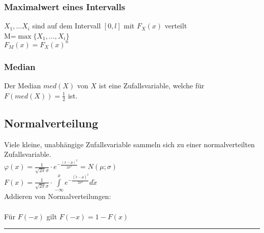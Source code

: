 \begin{multicols}{2}    
  \subsubsection{Maximalwert eines Intervalls}
    $X_1,\ldots X_i$ sind auf dem Intervall $[0,l]$ mit $F_X(x)$ verteilt\\
    M=$\max \{ X_1,\ldots,X_i\} $ \\
    $F_M(x)=F_X(x)^n$ \\
	\columnbreak
  \subsubsection{Median}
    Der Median $med(X)$ von $X$ ist eine Zufallsvariable, welche für
    $F(med(X)) = \frac{1}{2}$ ist.
  
\end{multicols}


\subsection{Normalverteilung}
\begin{minipage}{12cm}
	Viele kleine, unabhängige Zufallsvariable sammeln sich zu einer
	normalverteilten Zufallsvariable.\\
	$\varphi(x)=\frac{1}{\sqrt{2
			\pi}\sigma}\cdot e^{-\frac{(x-\mu)^2}{2\sigma^2}} = N(\mu ; \sigma) $\\ 
	$F(x)=\frac{1}{\sqrt{2\pi}\sigma}\cdot \int\limits^{x}_{-\infty}{e^{-\frac{(\tilde{x} -\mu)^2}{2\sigma^2}}} d\tilde{x} $ \\
	Addieren von Normalverteilungen: \\
	 \\
	Für $F(-x)$ gilt $F(-x) = 1 - F(x)$
\end{minipage}
\begin{minipage}{6cm}
	
\end{minipage}
\hrule


